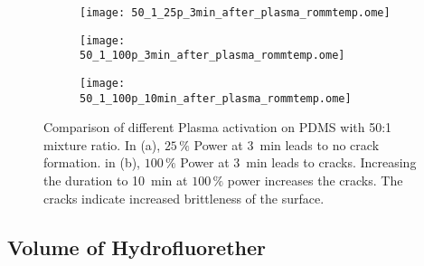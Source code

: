 \begin{figure}[hbt!]
	\centering
	\begin{subfigure}[]{0.45\textwidth}
		\centering
		\texttt{[image: 50\_1\_25p\_3min\_after\_plasma\_rommtemp.ome]}
		\caption{}
	\end{subfigure}
	\begin{subfigure}[]{0.45\textwidth}
		\centering
		\texttt{[image: 50\_1\_100p\_3min\_after\_plasma\_rommtemp.ome]}
		\caption{}
	\end{subfigure}
	\begin{subfigure}[]{0.45\textwidth}
		\centering
		\texttt{[image: 50\_1\_100p\_10min\_after\_plasma\_rommtemp.ome]}
		\caption{}
	\end{subfigure}
	\caption{Comparison of different Plasma activation on PDMS with 50:1 mixture ratio. In (a), $25\,\%$ Power at \SI{3}{\minute} leads to no crack formation. in (b), $100\,\%$ Power at \SI{3}{\minute} leads to cracks. Increasing the duration to \SI{10}{\minute} at $100\,\%$ power increases the cracks. The cracks indicate increased brittleness of the surface.}
	\label{fig:Vgl50:1Plasma}
\end{figure}

\FloatBarrier







\subsection{Volume of Hydrofluorether}

